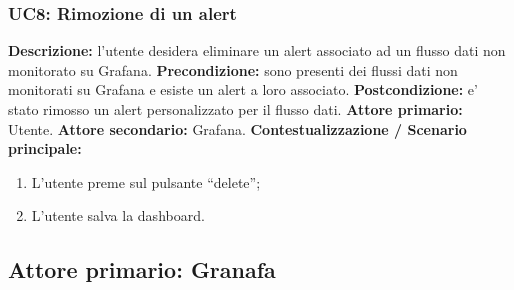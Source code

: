                 \subsubsection{UC8: Rimozione di un alert}
                    \textbf{Descrizione:}  l’utente desidera eliminare un alert associato ad un flusso dati non monitorato su Grafana.
                    \newline
                    \textbf{Precondizione:} sono presenti dei flussi dati non monitorati su Grafana e esiste un alert a loro associato.
                    \newline
                    \textbf{Postcondizione:} e’ stato rimosso un alert personalizzato per il flusso dati.
                    \newline
                    \textbf{Attore primario:} Utente.
                    \newline
                    \textbf{Attore secondario:} Grafana.
                    \newline
                    \textbf{Contestualizzazione / Scenario principale:} \begin{enumerate}
                            \item L’utente preme sul pulsante “delete”;
                            \item L’utente salva la dashboard.
                        \end{enumerate}
				
		\subsection{Attore primario: Granafa}	
		
